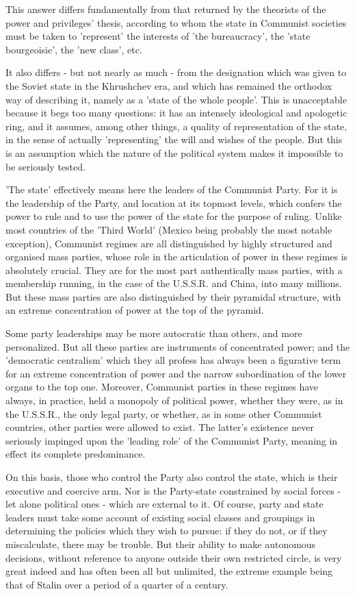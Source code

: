 This answer differs fundamentally from that returned by the theorists of the power and privileges' thesis, according to whom the state in Communist societies must be taken to 'represent' the interests of 'the bureaucracy', the 'state bourgeoisie', the 'new class', etc.

It also differs - but not nearly as much - from the designation which was given to the Soviet state in the Khrushchev era, and which has remained the orthodox way of describing it, namely as a 'state of the whole people'. This is unacceptable because it begs too many questions: it has an intensely ideological and apologetic ring, and it assumes, among other things, a quality of representation of the state, in the sense of actually 'representing' the will and wishes of the people. But this is an assumption which the nature of the political system makes it impossible to be seriously tested.

'The state' effectively means here the leaders of the Communist Party. For it is the leadership of the Party, and location at  its topmost levels, which confers the power to rule and to use the power of the state for the purpose of ruling. Unlike most countries of the 'Third World' (Mexico being probably the most notable exception), Communist regimes are all distinguished by highly structured and organised mass parties, whose role in the articulation of power in these regimes is absolutely crucial. They are for the most part authentically mass parties, with a membership running, in the case of the U.S.S.R. and China, into many millions. But these mass parties are also distinguished by their pyramidal structure, with an extreme concentration of power at the top of the pyramid.

Some party leaderships may be more autocratic than others, and more personalized. But all these parties are instruments of concentrated power; and the 'democratic centralism' which they all profess has always been a figurative term for an extreme concentration of power and the narrow subordination of the lower organs to the top one. Moreover, Communist parties in these regimes have always, in practice, held a monopoly of political power, whether they were, as in the U.S.S.R., the only legal party, or whether, as in some other Communist countries, other parties were allowed to exist. The latter's existence never seriously impinged upon the 'leading role' of the Communist Party, meaning in effect its complete predominance.

On this basis, those who control the Party also control the state, which is their executive and coercive arm. Nor is the Party-state constrained by social forces - let alone political ones - which are external to it. Of course, party and state leaders must take some account of existing social classes and groupings in determining the policies which they wish to pursue: if they do not, or if they miscalculate, there may be trouble. But their ability to make autonomous decisions, without reference to anyone outside their own restricted circle, is very great indeed and has often been all but unlimited, the extreme example being that of Stalin over a period of a quarter of a century.

